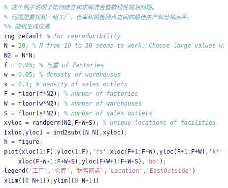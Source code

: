         \begin{lstlisting}[language = Matlab]
        %% 工厂，仓库和销售网点
        % 这个例子说明了如何建立和求解混合整数线性规划问题。
        % 问题是要找到一组工厂，仓库和销售网点之间的最佳生产和分销水平。
        %% 随机生成位置
        rng default % for reproducibility
        N = 20; % N from 10 to 30 seems to work. Choose large values with caution.
        N2 = N*N;
        f = 0.05; % 比重 of factories
        w = 0.05; % density of warehouses
        s = 0.1; % density of sales outlets
        F = floor(f*N2); % number of factories
        W = floor(w*N2); % number of warehouses
        S = floor(s*N2); % number of sales outlets
        xyloc = randperm(N2,F+W+S); % unique locations of facilities
        [xloc,yloc] = ind2sub([N N],xyloc);
        h = figure;
        plot(xloc(1:F),yloc(1:F),'rs',xloc(F+1:F+W),yloc(F+1:F+W),'k*',...
            xloc(F+W+1:F+W+S),yloc(F+W+1:F+W+S),'bo');
        legend('工厂','仓库','销售网点','Location','EastOutside')
        xlim([0 N+1]);ylim([0 N+1])


\end{lstlisting}
